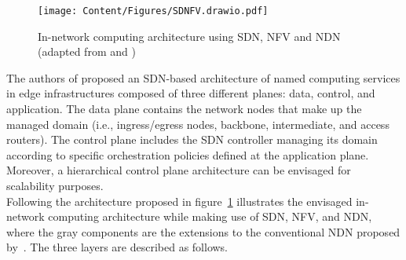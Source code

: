 \begin{figure}[h]
\texttt{[image: Content/Figures/SDNFV.drawio.pdf]}
\vspace*{-16mm}
\caption{In-network computing architecture using SDN, NFV and NDN (adapted from \cite{8856241} and \cite{10.11453445814.3446760})}
\label{fig:incArchitecture}
\end{figure}
The authors of \cite{8856241} proposed an SDN-based architecture of named computing services in edge infrastructures composed of three different planes: data, control, and application. The data plane contains the network nodes that make up the managed domain (i.e., ingress/egress nodes, backbone, intermediate, and access routers). The control plane includes the SDN controller managing its domain according to specific orchestration policies defined at the application plane. Moreover, a hierarchical control plane architecture can be envisaged for scalability purposes.\\
Following the architecture proposed in \cite{8856241} figure~\ref{fig:incArchitecture} illustrates the envisaged in-network computing architecture while making use of SDN, NFV, and NDN, where the gray components are the extensions to the conventional NDN proposed by~\cite{10.11453445814.3446760}. The three layers are described as follows.
